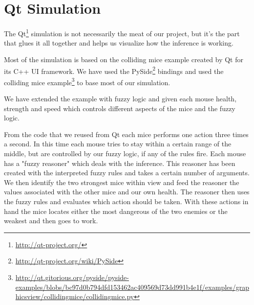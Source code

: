 \section{Qt Simulation}\label{qt simulation}
The Qt\footnote{\url{http://qt-project.org/}} simulation is not necessarily the
meat of our project, but it's the part that glues it all together and helps us
visualize how the inference is working.

Most of the simulation is based on the colliding mice example created by Qt
for its C++ UI framework. We have used the PySide\footnote{\url{http://qt-project.org/wiki/PySide}}
bindings and used the colliding mice example\footnote{\url{http://qt.gitorious.org/pyside/pyside-examples/blobs/bc97d0b794dfd153462ac409569d73dd991b4e1f/examples/graphicsview/collidingmice/collidingmice.py}}
to base most of our simulation.

We have extended the example with fuzzy logic and given each mouse health, strength and speed
which controls different aspects of the mice and the fuzzy logic.

From the code that we reused from Qt each mice performs one action three times a
second. In this time each mouse tries to stay within a certain range of the middle,
but are controlled by our fuzzy logic, if any of the rules fire. Each mouse
has a "fuzzy reasoner" which deals with the inference. This reasoner has been created
with the interpreted fuzzy rules and takes a certain number of arguments. We then
identify the two strongest mice within view and feed the reasoner the values associated
with the other mice and our own health. The reasoner then uses the fuzzy rules and
evaluates which action should be taken. With these actions in hand the mice locates
either the most dangerous of the two enemies or the weakest and then goes to work.
